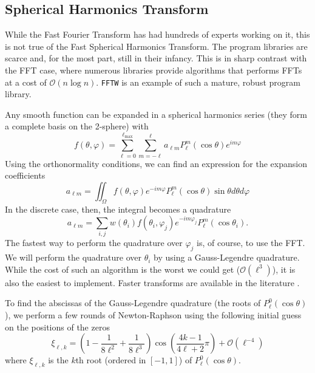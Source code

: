 \subsection{Spherical Harmonics Transform}
While the Fast Fourier Transform has had hundreds
of experts working on it, this is not true of the 
Fast Spherical Harmonics Transform. The program libraries
are scarce and, for the most part, still in their infancy. 
This is in sharp contrast with the FFT case, where numerous 
libraries provide algorithms that performs FFTs at a cost 
of $\mathcal{O}(n\log n)$. \texttt{FFTW} is an example of such a mature, 
robust program library.

Any smooth function can be expanded in a spherical harmonics
series (they form a complete basis on the 2-sphere) with \cite[\S 6.7.1]{PRE2007}
  \begin{equation}
    f(\theta,\varphi) = \sum_{\ell=0}^{\ell_\text{max}}\sum_{m=-\ell}^\ell a_{\ell m}P_\ell^m(\cos\theta)e^{im\varphi}
  \end{equation}
Using the orthonormality conditions, we can find an expression for the expansion coefficients
  \begin{equation}
   a_{\ell m} = \mathop{\iint}_\Omega f(\theta,\varphi)e^{-im\varphi}P_\ell^m(\cos\theta)\sin\theta d\theta d\varphi
  \end{equation}
In the discrete case, then, the integral becomes a quadrature
  \begin{equation}
   a_{\ell m} = \sum_{i,j}w(\theta_i)f(\theta_i,\varphi_j)e^{-im\varphi_j}P_\ell^m(\cos\theta_i).
  \end{equation}
The fastest way to perform the quadrature over $\varphi_j$ is, of course, to use
the FFT. We will perform the quadrature over $\theta_i$ by using a Gauss-Legendre
quadrature. While the cost of such an algorithm is the worst we could get ($\mathcal{O}(\ell^3)$), 
it is also the easiest to implement. Faster transforms are available in the literature \cite{TYG2006,TYG2008,TYG2010}.

To find the abscissas of the Gauss-Legendre quadrature (the roots
of $P_\ell^0(\cos\theta)$), we perform a few rounds of Newton-Raphson 
using the following initial guess on the positions of the zeros \cite{ABR1965}
  \begin{equation}
   \xi_{\ell,k} = \left(1-\frac{1}{8\ell^2}+\frac{1}{8\ell^3}\right)\cos\left(\frac{4k-1}{4\ell+2}\pi\right)+\mathcal{O}\left(\ell^{-4}\right)
  \end{equation}
where $\xi_{\ell,k}$ is the $k$th root (ordered in $[-1,1]$) of $P_\ell^0(\cos\theta)$.

